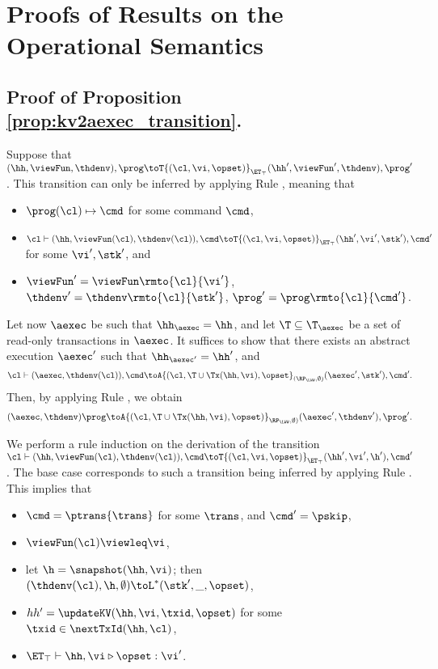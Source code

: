 \section{Proofs of Results on the Operational Semantics}

\subsection{Proof of Proposition \ref{prop:kv2aexec_transition}.}
\label{sec:kv2aexec-transaction}

Suppose that $(\hh, \viewFun, \thdenv), \prog \toT{(\cl, \vi, \opset)}_{\ET_{\top}} (\hh', \viewFun', \thdenv), \prog'$. 
This transition can only be inferred by applying Rule , meaning that 
\begin{itemize}
\item $\prog(\cl) \mapsto \cmd$ for some command $\cmd$, 
\item $\cl \vdash (\hh, \viewFun(\cl), \thdenv(\cl)), \cmd \toT{(\cl, \vi, \opset)}_{\ET_{\top}} (\hh', \vi', \stk'), \cmd'$ 
for some $\vi', \stk'$, and 
\item $\viewFun' = \viewFun\rmto{\cl}{\vi'}$, $\thdenv' = \thdenv\rmto{\cl}{\stk'}$, $\prog' = \prog\rmto{\cl}{\cmd'}$. 
\end{itemize}
Let now $\aexec$ be such that $\hh_{\aexec} = \hh$, and let $\T \subseteq \T_{\aexec}$ be a set of read-only 
transactions in $\aexec$. It suffices to show that there exists an abstract execution $\aexec'$ such that 
$\hh_{\aexec'} = \hh'$, and 
\[
\cl \vdash (\aexec, \thdenv(\cl)), \cmd \toA{(\cl, \T \cup \Tx(\hh, \vi), \opset}_{(\RP_{\LWW}, \emptyset)} (\aexec', \stk'), \cmd'.
\]
Then, by applying Rule , we obtain 
\[ 
(\aexec, \thdenv) \prog \toA{(\cl, \T \cup \Tx(\hh,\vi), \opset)}_{\RP_{\LWW}, \emptyset)} (\aexec' ,\thdenv'), \prog'.
\]

We perform a rule induction on the derivation of the transition $\cl \vdash (\hh, \viewFun(\cl), \thdenv(\cl)), \cmd \toT{(\cl, \vi, \opset)}_{\ET_{\top}} (\hh', \vi', \h'), \cmd'$. 
The base case corresponds to such a transition being inferred by applying Rule . 
This implies that 
\begin{itemize}
\item $\cmd = \ptrans{\trans}$ for some $\trans$, and $\cmd' = \pskip$,
\item $\viewFun(\cl) \viewleq \vi$, 
\item let $\h = \snapshot(\hh, \vi)$; then $(\thdenv(\cl), \h, \emptyset) \toL^{\ast} (\stk', \_, \opset)$, 
\item $hh' = \updateKV(\hh, \vi, \txid, \opset)$ for some $\txid \in \nextTxId(\hh, \cl)$, 
\item $\ET_{\top} \vdash \hh, \vi \triangleright \opset: \vi'$.
\end{itemize}

